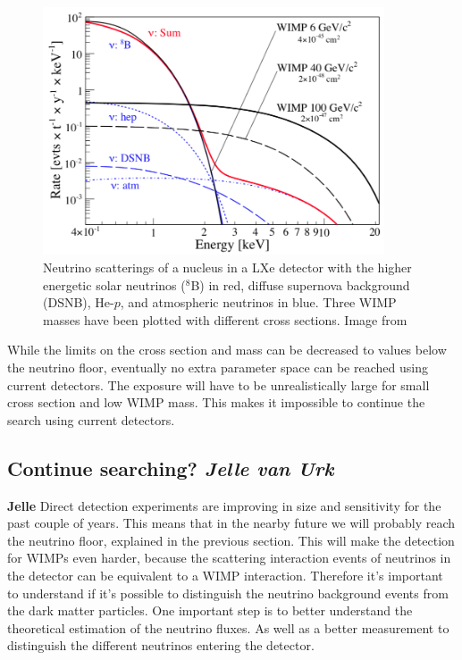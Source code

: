 \documentclass{article}
\begin{document}
\begin{figure}[h!]
    \centering
    \includegraphics[width=0.9\textwidth]{Nuclear_neutrino.png}
    \caption{Neutrino scatterings of a nucleus in a LXe detector with the higher energetic solar neutrinos (${}^8$B) in red, diffuse supernova background (DSNB), He-$p$, and atmospheric neutrinos in blue. Three WIMP masses have been plotted with different cross sections. Image from \cite{Baudis:2013qla}}
    \label{fig:nuclear_neutrino}
\end{figure}

While the limits on the cross section and mass can be decreased to values below the neutrino floor, eventually no extra parameter space can be reached using current detectors. The exposure will have to be unrealistically large for small cross section and low WIMP mass. This makes it impossible to continue the search using current detectors.

\subsection{Continue searching? \small{\textit{Jelle van Urk}}}
\textbf{Jelle}
Direct detection experiments are improving in size and sensitivity for the past couple of years. This means that in the nearby future we will probably reach the neutrino floor, explained in the previous section. This will make the detection for WIMPs even harder, because the scattering interaction events of neutrinos in the detector can be equivalent to a WIMP interaction. Therefore  it's important to understand if it's possible to distinguish the neutrino background events from the dark matter particles. One important step is to better understand the theoretical estimation of the neutrino fluxes. As well as a better measurement to distinguish the different neutrinos entering the detector. 
\end{document}
